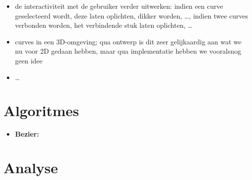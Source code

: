 \documentclass[a4paper,11pt,oneside, titlepage]{article}
\begin{document}
\begin{itemize}
\begin{itemize}
\begin{itemize}
\item Soundmixer: de curve, of curves voor meerdere instrumenten bijvoorbeeld, stelt dan een tijdslijn voor. De X-as wordt dan van links naar rechts doorlopen, en hoe hoger de corresponderende Y-waarde op dat moment, hoe hoger de toon die men te horen krijgt.
\item Transformer: we geven een afbeelding en laten die weergeven. De gebruiker plaatst een aantal punten in het vlak, en alnaargelang hij ze nadien versleept, vervormt de afbeelding. Ons lijkt dit het moeilijkst van al te implementeren, maar niet z\'o onoverkomelijk. 
\item Curving: we geven een afbeelding in, en krijgen een curve-variant van die afbeelding terug. Elke lijn op de afbeelding wordt dus omgezet in \'e\'en of andere curve en weergegeven.
\item \ldots
\end{itemize}
\item de interactiviteit met de gebruiker verder uitwerken: indien een curve geselecteerd wordt, deze laten oplichten, dikker worden, \ldots, indien twee curves verbonden worden, het verbindende stuk laten oplichten, \ldots
\item curves in een 3D-omgeving; qua ontwerp is dit zeer gelijkaardig aan wat we nu voor 2D gedaan hebben, maar qua implementatie hebben we vooralsnog geen idee
\item \ldots
\end{itemize}
\end{itemize}

\section{Algoritmes}
\begin{itemize}
\item \bf{Bezier:}\newline
{}
\end{itemize}

\section{Analyse}
\end{document}

